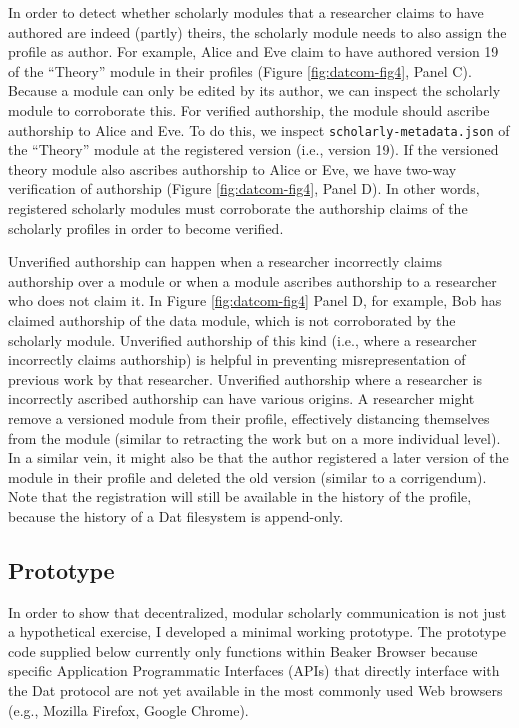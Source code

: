 \documentclass[publications,article,submit,moreauthors,pdftex,10pt,a4paper]{Definitions/mdpi}
\begin{document}
In order to detect whether scholarly modules that a researcher claims to
have authored are indeed (partly) theirs, the scholarly module needs to
also assign the profile as author. For example, Alice and Eve claim to
have authored version 19 of the ``Theory'' module in their profiles
(Figure \ref{fig:datcom-fig4}, Panel C). Because a module can only be
edited by its author, we can inspect the scholarly module to corroborate
this. For verified authorship, the module should ascribe authorship to
Alice and Eve. To do this, we inspect \texttt{scholarly-metadata.json}
of the ``Theory'' module at the registered version (i.e., version 19).
If the versioned theory module also ascribes authorship to Alice or Eve,
we have two-way verification of authorship (Figure
\ref{fig:datcom-fig4}, Panel D). In other words, registered scholarly
modules must corroborate the authorship claims of the scholarly profiles
in order to become verified.

Unverified authorship can happen when a researcher incorrectly claims
authorship over a module or when a module ascribes authorship to a
researcher who does not claim it. In Figure \ref{fig:datcom-fig4} Panel
D, for example, Bob has claimed authorship of the data module, which is
not corroborated by the scholarly module. Unverified authorship of this
kind (i.e., where a researcher incorrectly claims authorship) is helpful
in preventing misrepresentation of previous work by that researcher.
Unverified authorship where a researcher is incorrectly ascribed
authorship can have various origins. A researcher might remove a
versioned module from their profile, effectively distancing themselves
from the module (similar to retracting the work but on a more individual
level). In a similar vein, it might also be that the author registered a
later version of the module in their profile and deleted the old version
(similar to a corrigendum). Note that the registration will still be
available in the history of the profile, because the history of a Dat
filesystem is append-only.

\subsection*{Prototype}\label{prototype}

In order to show that decentralized, modular scholarly communication
is not just a hypothetical exercise, I developed a minimal working
prototype. The prototype code supplied below currently only functions
within Beaker Browser because specific Application Programmatic
Interfaces (APIs) that directly interface with the Dat protocol are
not yet available in the most commonly used Web browsers (e.g.,
Mozilla Firefox, Google Chrome).
\end{document}
